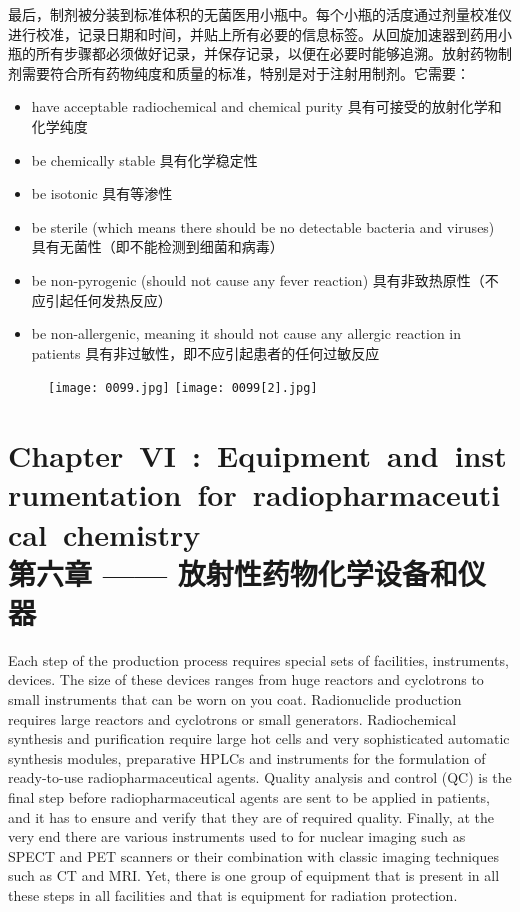 \documentclass[dvipsnames, svgnames,a4paper,11pt]{article}
\begin{document}
最后，制剂被分装到标准体积的无菌医用小瓶中。每个小瓶的活度通过剂量校准仪进行校准，记录日期和时间，并贴上所有必要的信息标签。从回旋加速器到药用小瓶的所有步骤都必须做好记录，并保存记录，以便在必要时能够追溯。放射药物制剂需要符合所有药物纯度和质量的标准，特别是对于注射用制剂。它需要：  

\begin{itemize}
  \item have acceptable radiochemical and chemical purity 具有可接受的放射化学和化学纯度
  \item be chemically stable 具有化学稳定性
  \item be isotonic 具有等渗性
  \item be sterile (which means there should be no detectable bacteria and viruses) 具有无菌性（即不能检测到细菌和病毒）
  \item be non-pyrogenic (should not cause any fever reaction) 具有非致热原性（不应引起任何发热反应）
  \item be non-allergenic, meaning it should not cause any allergic reaction in patients 具有非过敏性，即不应引起患者的任何过敏反应
\end{itemize}

\begin{figure}[htbp]
	\centering
    \texttt{[image: 0099.jpg]}    
    \hspace{0.1in}
    \texttt{[image: 0099[2].jpg]} 
     \label{fig95}
\end{figure}

\newpage

\section{\mbox{Chapter VI : Equipment and instrumentation for radiopharmaceutical chemistry}\\第六章 —— 放射性药物化学设备和仪器}


Each step of the production process requires special sets of facilities, instruments,
devices. The size of these devices ranges from huge reactors and cyclotrons to
small instruments that can be worn on you coat. Radionuclide production requires
large reactors and cyclotrons or small generators. Radiochemical synthesis and
purification require large hot cells and very sophisticated automatic synthesis
modules, preparative HPLCs and instruments for the formulation of ready-to-use
radiopharmaceutical agents. Quality analysis and control (QC) is the final step before
radiopharmaceutical agents are sent to be applied in patients, and it has to ensure
and verify that they are of required quality. Finally, at the very end there are various
instruments used to for nuclear imaging such as SPECT and PET scanners or their
combination with classic imaging techniques such as CT and MRI. Yet, there is one
group of equipment that is present in all these steps in all facilities and that is
equipment for radiation protection.
\end{document}

